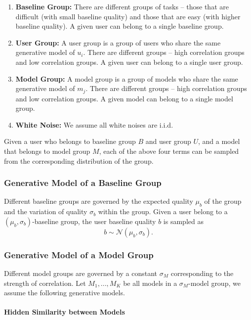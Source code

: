 \begin{enumerate}
\item {\bf Baseline Group:} There are different groups of tasks -- those that are difficult (with small
baseline quality) and those that are easy (with higher baseline quality). A given user can belong
to a single baseline group.
\item {\bf User Group:} A user group is a group of users who share the
same generative model of $u_i$. There are different groups -- high correlation groups
and low correlation groups. A given user can belong to a single user group.
\item {\bf Model Group:} A model group is a group of models who share
the same generative model of $m_j$. There are different groups -- high correlation groups
and low correlation groups. A given model can belong to a single model group.
\item {\bf White Noise:} We assume all white noises are i.i.d.
\end{enumerate}

Given a user who belongs to baseline group $B$ and user group $U$,
and a model that belongs to model group $M$, each of the above four terms
can be sampled from the corresponding distribution of the group.

\subsubsection{Generative Model of a Baseline Group}

Different baseline groups are governed by the expected quality $\mu_b$ of the group
and the variation of quality $\sigma_b$ within the group. Given a user
belong to a $(\mu_b, \sigma_b)$-baseline group, the user baseline quality 
$b$ is sampled as
\[
b \sim \mathcal{N}(\mu_b, \sigma_b).
\]

\subsubsection{Generative Model of a Model Group}

Different model groups are governed by a constant $\sigma_M$ corresponding to
the strength of correlation. Let ${M_1,...,M_K}$ be all models in a
$\sigma_M$-model group, we assume the following generative models.

\paragraph*{Hidden Similarity between Models}

